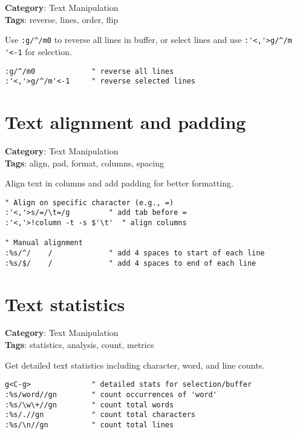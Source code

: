 {{{{{{{{{{{{{{\textbf{Category}: Text Manipulation\\ \textbf{Tags}: reverse, lines, order, flip
\vspace{0.5cm}

Use {\footnotesize \Verb§:g/^/m0§} to reverse all lines in buffer, or select lines and use {\footnotesize \Verb§:'<,'>g/^/m '<-1§} for selection.

\begin{Exa*}{}
\begin{Verbatim}[fontsize=\footnotesize, breaklines, breakanywhere]
:g/^/m0             " reverse all lines
:'<,'>g/^/m'<-1     " reverse selected lines
\end{Verbatim}
\end{Exa*}

\section{Text alignment and padding}

\textbf{Category}: Text Manipulation\\ \textbf{Tags}: align, pad, format, columns, spacing
\vspace{0.5cm}

Align text in columns and add padding for better formatting.

\begin{Exa*}{}
\begin{Verbatim}[fontsize=\footnotesize, breaklines, breakanywhere]
" Align on specific character (e.g., =)
:'<,'>s/=/\t=/g         " add tab before =
:'<,'>!column -t -s $'\t'  " align columns

" Manual alignment
:%s/^/    /             " add 4 spaces to start of each line
:%s/$/    /             " add 4 spaces to end of each line
\end{Verbatim}
\end{Exa*}

\section{Text statistics}

\textbf{Category}: Text Manipulation\\ \textbf{Tags}: statistics, analysis, count, metrics
\vspace{0.5cm}

Get detailed text statistics including character, word, and line counts.

\begin{Exa*}{}
\begin{Verbatim}[fontsize=\footnotesize, breaklines, breakanywhere]
g<C-g>              " detailed stats for selection/buffer
:%s/word//gn        " count occurrences of 'word'
:%s/\w\+//gn        " count total words
:%s/.//gn           " count total characters
:%s/\n//gn          " count total lines
\end{Verbatim}
\end{Exa*}

}}}}}}}}}}}}}}
